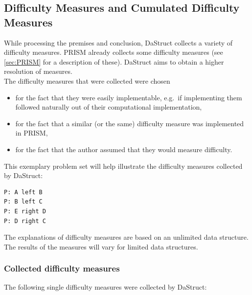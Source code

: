 \documentclass[hidelinks]{scrartcl}
\begin{document}
\subsection{Difficulty Measures and Cumulated Difficulty Measures}\label{sec:difficulty_measures}
While processing the premises and conclusion, DaStruct collects a variety of difficulty measures. PRISM already collects some difficulty measures (see \ref{sec:PRISM} for a description of these). DaStruct aims to obtain a higher resolution of measures. \\
The difficulty measures that were collected were chosen 
\begin{itemize}
	\item for the fact that they were easily implementable, e.g.\ if implementing them followed naturally out of their computational implementation,
	\item for the fact that a similar (or the same) difficulty measure was implemented in PRISM,
	\item for the fact that the author assumed that they would measure difficulty.
\end{itemize}
This exemplary problem set will help illustrate the difficulty measures collected by DaStruct:

\begin{lstlisting}[caption=Exemplary problem file, label=pf:example_pf_diff_measures, frame=single]
P: A left B
P: B left C
P: E right D
P: D right C
\end{lstlisting}

\noindent The explanations of difficulty measures are based on an unlimited data structure. The results of the measures will vary for limited data structures.

\subsubsection{Collected difficulty measures}
The following single difficulty measures were collected by DaStruct:
\end{document}
